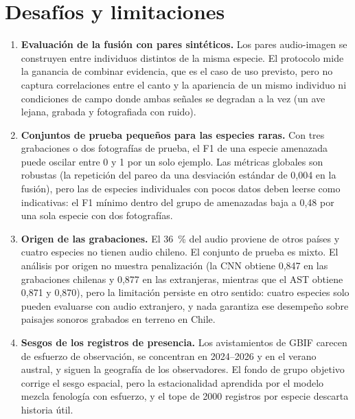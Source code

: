\section{Desafíos y limitaciones}\label{sec:limitaciones}

\begin{enumerate}[leftmargin=*, itemsep=3pt]
  \item \textbf{Evaluación de la fusión con pares sintéticos.} Los pares
        audio-imagen se construyen entre individuos distintos de la misma
        especie. El protocolo mide la ganancia de combinar evidencia, que es
        el caso de uso previsto, pero no captura correlaciones entre el canto
        y la apariencia de un mismo individuo ni condiciones de campo donde
        ambas señales se degradan a la vez (un ave lejana, grabada y
        fotografiada con ruido).
  \item \textbf{Conjuntos de prueba pequeños para las especies raras.} Con
        tres grabaciones o dos fotografías de prueba, el F1 de una especie
        amenazada puede oscilar entre 0 y 1 por un solo ejemplo. Las métricas
        globales son robustas (la repetición del pareo da una desviación
        estándar de 0,004 en la fusión), pero las de especies individuales
        con pocos datos deben leerse como indicativas: el F1 mínimo dentro del
        grupo de amenazadas baja a 0,48 por una sola especie con dos
        fotografías.
  \item \textbf{Origen de las grabaciones.} El \SI{36}{\percent} del audio
        proviene de otros países y cuatro especies no tienen audio chileno.
        El conjunto de prueba es mixto. El análisis por origen no muestra
        penalización (la CNN obtiene 0,847 en las grabaciones chilenas y 0,877
        en las extranjeras, mientras que el AST obtiene 0,871 y 0,870), pero la limitación
        persiste en otro sentido: cuatro especies solo pueden evaluarse con
        audio extranjero, y nada garantiza ese desempeño sobre paisajes
        sonoros grabados en terreno en Chile.
  \item \textbf{Sesgos de los registros de presencia.} Los avistamientos de
        GBIF carecen de esfuerzo de observación, se concentran en 2024--2026 y
        en el verano austral, y siguen la geografía de los observadores. El
        fondo de grupo objetivo corrige el sesgo espacial, pero la estacionalidad
        aprendida por el modelo mezcla fenología con esfuerzo, y el tope de
        \num{2000} registros por especie descarta historia útil.

\end{enumerate}
